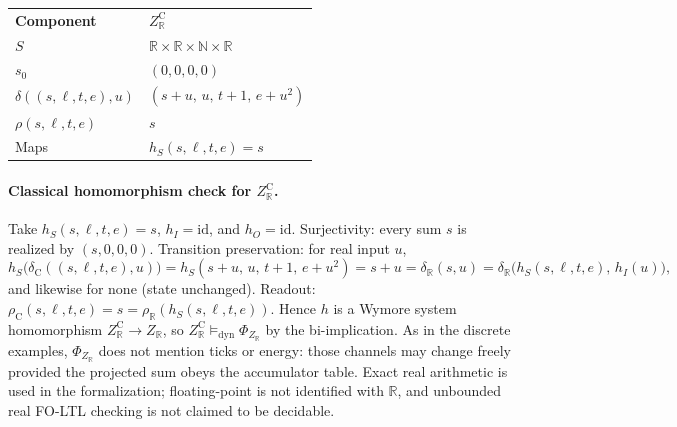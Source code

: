 \begingroup
\renewcommand{\arraystretch}{1.2}
\footnotesize
\begin{center}
\begin{tabularx}{0.78\linewidth}{@{}>{\raggedright\arraybackslash}p{2.8cm}Y@{}}
    \headingfont\bfseries Component & \headingfont\bfseries $Z_{\mathbb{R}}^{\mathrm{C}}$ \\
    \addlinespace[2pt]
    $S$ & $\mathbb{R}\times\mathbb{R}\times\mathbb{N}\times\mathbb{R}$ \\
    \addlinespace[2pt]
    $s_0$ & $(0,0,0,0)$ \\
    \addlinespace[2pt]
    $\delta((s,\ell,t,e),u)$ & $(s{+}u,\,u,\,t{+}1,\,e{+}u^{2})$ \\
    \addlinespace[2pt]
    $\rho(s,\ell,t,e)$ & $s$ \\
    \addlinespace[2pt]
    Maps & $h_S(s,\ell,t,e)=s$ \\
\end{tabularx}
\end{center}
\label{tab:z-real-cplx}
\endgroup
\vspace{4pt}

\paragraph{Classical homomorphism check for $Z_{\mathbb{R}}^{\mathrm{C}}$.}
Take $h_S(s,\ell,t,e)=s$, $h_I=\mathrm{id}$, and $h_O=\mathrm{id}$. Surjectivity: every sum $s$ is realized by $(s,0,0,0)$. Transition preservation: for real input $u$,
\[
  h_S\bigl(\delta_{\mathrm{C}}((s,\ell,t,e),u)\bigr)
  = h_S(s{+}u,\,u,\,t{+}1,\,e{+}u^{2})
  = s{+}u
  = \delta_{\mathbb{R}}(s,u)
  = \delta_{\mathbb{R}}\bigl(h_S(s,\ell,t,e),\,h_I(u)\bigr),
\]
and likewise for $\mathrm{none}$ (state unchanged). Readout: $\rho_{\mathrm{C}}(s,\ell,t,e)=s=\rho_{\mathbb{R}}(h_S(s,\ell,t,e))$. Hence $h$ is a Wymore system homomorphism $Z_{\mathbb{R}}^{\mathrm{C}}\to Z_{\mathbb{R}}$, so $Z_{\mathbb{R}}^{\mathrm{C}}\models_{\mathrm{dyn}}\Phi_{Z_{\mathbb{R}}}$ by the bi-implication. As in the discrete examples, $\Phi_{Z_{\mathbb{R}}}$ does not mention ticks or energy: those channels may change freely provided the projected sum obeys the accumulator table. Exact real arithmetic is used in the formalization; floating-point is not identified with $\mathbb{R}$, and unbounded real FO-LTL checking is not claimed to be decidable.
